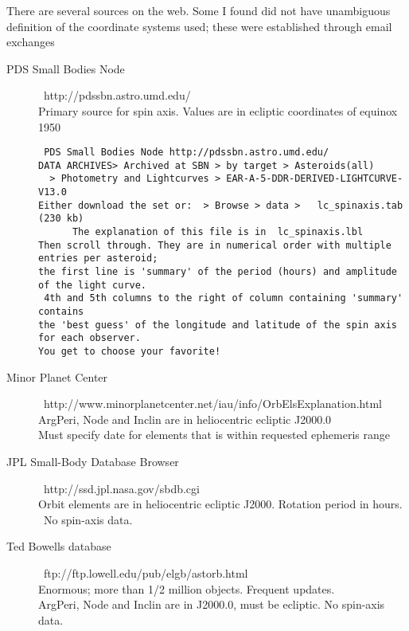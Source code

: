 \documentclass[draft]{article}  %
\newcommand{\qi}{\\ \hspace*{2.em}}      %
\begin{document}
There are several sources on the web. Some I found did not have unambiguous definition of the coordinate systems used; these were established through email exchanges
\begin{description}  %

\item [PDS Small Bodies Node] \  http://pdssbn.astro.umd.edu/
\\ Primary source for spin axis.  Values are in ecliptic coordinates of equinox 1950
\vspace{-3.mm} 
\begin{verbatim}
 PDS Small Bodies Node http://pdssbn.astro.umd.edu/ 
DATA ARCHIVES> Archived at SBN > by target > Asteroids(all) 
  > Photometry and Lightcurves > EAR-A-5-DDR-DERIVED-LIGHTCURVE-V13.0 
Either download the set or:  > Browse > data >   lc_spinaxis.tab (230 kb)
      The explanation of this file is in  lc_spinaxis.lbl
Then scroll through. They are in numerical order with multiple entries per asteroid; 
the first line is 'summary' of the period (hours) and amplitude of the light curve.
 4th and 5th columns to the right of column containing 'summary' contains 
the 'best guess' of the longitude and latitude of the spin axis for each observer.
You get to choose your favorite! 
\end{verbatim}


\item [Minor Planet Center]  \  http://www.minorplanetcenter.net/iau/info/OrbElsExplanation.html 
\\ ArgPeri, Node and Inclin are in heliocentric ecliptic J2000.0
\qi Must specify date for elements that is within requested ephemeris range

\item [JPL Small-Body Database Browser]  \ http://ssd.jpl.nasa.gov/sbdb.cgi
\\ Orbit elements are in heliocentric ecliptic J2000.  Rotation period in hours. \ No spin-axis data.

\item [Ted Bowells database]   \ ftp://ftp.lowell.edu/pub/elgb/astorb.html
\\ Enormous; more than 1/2 million objects. Frequent updates. 
\\ ArgPeri, Node and Inclin are in J2000.0,  must be ecliptic. No spin-axis data.

\end{description}
\end{document}
